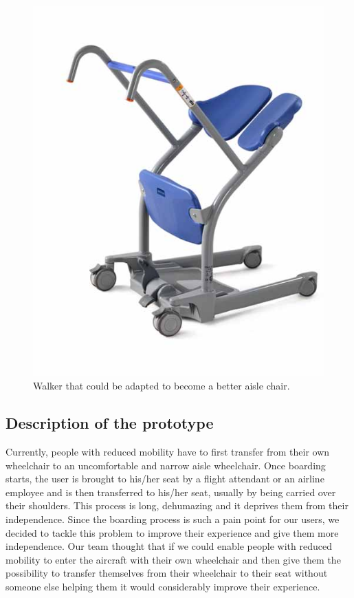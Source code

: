 \begin{figure}[h]
  \centering
     \includegraphics[scale=0.5]{images/walker.jpg}
   \caption{Walker that could be adapted to become a better aisle chair.}%
  \label{fig:walker.jpg}
\end{figure} 

\subsection{Description of the prototype}
Currently, people with reduced mobility have to first transfer from their own wheelchair to an uncomfortable and narrow aisle wheelchair. Once boarding starts, the user is brought to his/her seat by a flight attendant or an airline employee and is then transferred to his/her seat, usually by being carried over their shoulders. This process is long, dehumazing and it deprives them from their independence. Since the boarding process is such a pain point for our users, we decided to tackle this problem to improve their experience and give them more independence. Our team thought that if we could enable people with reduced mobility to enter the aircraft with their own wheelchair and then give them the possibility to transfer themselves from their wheelchair to their seat without someone else helping them it would considerably improve their experience.
\\

